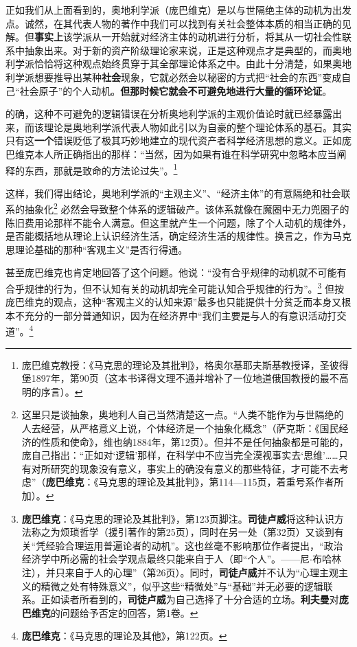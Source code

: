 \documentclass[fontset=fandol, a4paper, 12pt, openright]{ctexbook}
\begin{document}
正如我们从上面看到的，奥地利学派（庞巴维克）是以与世隔绝主体的动机为出发点。诚然，在其代表人物的著作中我们可以找到有关社会整体本质的相当正确的见解。但\textbf{事实上}该学派从一开始就对经济主体的动机进行分析，将其从一切社会性联系中抽象出来。对于新的资产阶级理论家来说，正是这种观点才是典型的，而奥地利学派恰恰将这种观点始终贯穿于其全部理论体系之中。由此十分清楚，如果奥地利学派想要推导出某种\textbf{社会}现象，它就必然会以秘密的方式把“社会的东西”变成自己“社会原子”的个人动机。\textbf{但那时候它就会不可避免地进行大量的循环论证}。

的确，这种不可避免的逻辑错误在分析奥地利学派的主观价值论时就已经暴露出来，而该理论是奥地利学派代表人物如此引以为自豪的整个理论体系的基石。其实只有这\textbf{一个}错误贬低了极其巧妙地建立的现代资产者科学经济思想的意义。正如庞巴维克本人所正确指出的那样：“当然，因为如果有谁在科学研究中忽略本应当阐释的东西，那就是致命的方法论过失”。\footnote{庞巴维克教授：《马克思的理论及其批判》，格奥尔基耶夫斯基教授译，圣彼得堡1897年，第90页（这本书译得文理不通并增补了一位地道俄国教授的最不高明的序言）。}

这样，我们得出结论，奥地利学派的“主观主义”、“经济主体”的有意隔绝和社会联系的抽象化\footnote{这里只是谈抽象，奥地利人自己当然清楚这一点。“人类不能作为与世隔绝的人去经营，从严格意义上说，个体经济是一个抽象化概念”（萨克斯：《国民经济的性质和使命》，维也纳1884年，第12页）。但并不是任何抽象都是可能的，庞自己指出：“正如对‘逻辑’那样，在科学中不应当完全漠视事实去‘思维’……只有对所研究的现象没有意义，事实上的确没有意义的那些特征，才可能不去考虑”（\textbf{庞巴维克}：《马克思的理论及其批判》，第114—115页，着重号系作者所加）。} 必然会导致整个体系的逻辑破产。该体系就像在魔圈中无力兜圈子的陈旧费用论那样不能令人满意。但这里就产生一个问题，除了个人动机的规律外，是否能概括地从理论上认识经济生活，确定经济生活的规律性。换言之，作为马克思理论基础的那种“客观主义”是否行得通。

甚至庞巴维克也肯定地回答了这个问题。他说：“没有合乎规律的动机就不可能有合乎规律的行为，但不认知有关的动机却完全可能认知合乎规律的行为”。\footnote{\textbf{庞巴维克}：《马克思的理论及其批判》，第123页脚注。\textbf{司徒卢威}将这种认识方法称之为烦琐哲学（援引著作的第25页），同时在另一处（第32页）又谈到有关“凭经验合理运用普遍论者的动机”。这也丝毫不影响那位作者提出，“政治经济学中所必需的社会学观点最终只能来自于人（即“个人”。——尼$\cdot$布哈林注），并只来自于人的心理”（第26页）。同时，\textbf{司徒卢威}并不认为“心理主观主义的精微之处有特殊意义”，似乎这些“精微处”与“基础”并无必要的逻辑联系。正如读者所看到的，\textbf{司徒卢威}为自己选择了十分合适的立场。\textbf{利夫曼}对\textbf{庞巴维克}的问题给予否定的回答，第1卷。} 但按庞巴维克的观点，这种“客观主义的认知来源”最多也只能提供十分贫乏而本身又根本不充分的一部分普通知识，因为在经济界中“我们主要是与人的有意识活动打交道”。\footnote{\textbf{庞巴维克}：《马克思的理论及其他》，第122页。}
\end{document}
